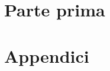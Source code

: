 \documentclass[a4paper, 11pt, twoside, openright, italian]{memoir}
\begin{document}
\frontmatter
%



\mainmatter
\part{Parte prima}


\appendix
\part{Appendici}

\backmatter

\end{document}
